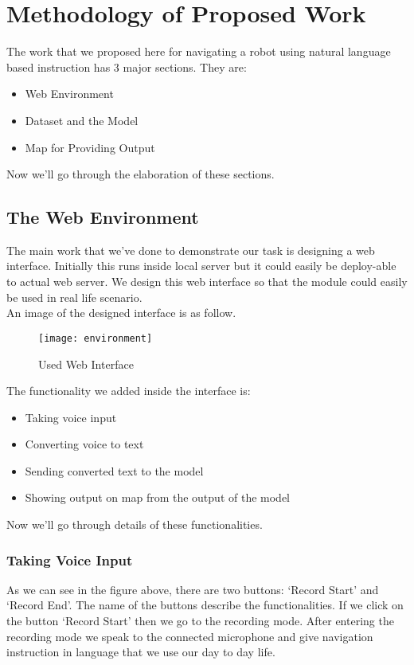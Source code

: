 \chapter{Methodology of Proposed Work}
The work that we proposed here for navigating a robot using natural language based instruction has 3 major sections. They are:
\begin{itemize}
    \item Web Environment
    \item Dataset and the Model
    \item Map for Providing Output
\end{itemize}
Now we'll go through the elaboration of these sections. \\

\section{The Web Environment}
The main work that we've done to demonstrate our task is designing a web interface. Initially this runs inside local server but it could easily be deploy-able to actual web server. We design this web interface so that the module could easily be used in real life scenario.\\

An image of the designed interface is as follow. \\
\begin{figure}[h]
    \centering
    \texttt{[image: environment]}
    \caption{Used Web Interface}
\end{figure}
\vline

The functionality we added inside the interface is: \\
\begin{itemize}
    \item Taking voice input
    \item Converting voice to text
    \item Sending converted text to the model
    \item Showing output on map from the output of the model
\end{itemize}

Now we'll go through details of these functionalities. \\

\subsection{Taking Voice Input}
As we can see in the figure above, there are two buttons: `Record Start' and `Record End'. The name of the buttons describe the functionalities. If we click on the button `Record Start' then we go to the recording mode. After entering the recording mode we speak to the connected microphone and give navigation instruction in language that we use our day to day life. \\

